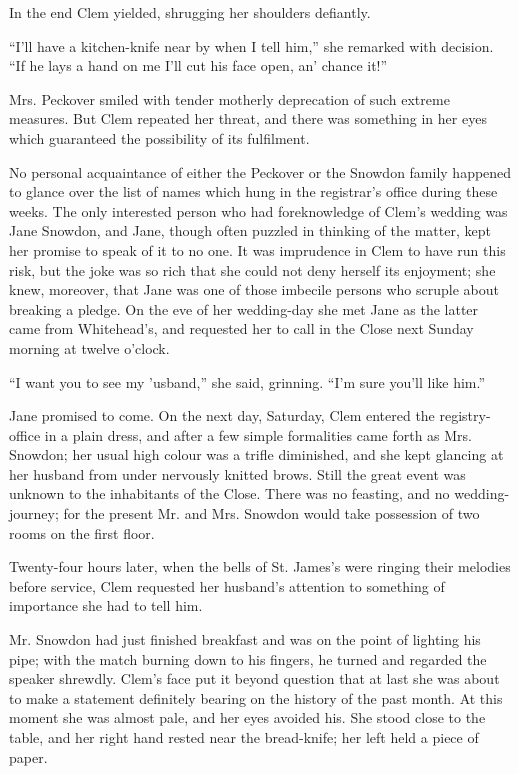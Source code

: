 In the end Clem yielded, shrugging her shoulders defiantly.

``I'll have a kitchen-knife near by when I tell him,'' she remarked with
decision. ``If he lays a hand on me I'll cut his face open, an' chance
it!''

Mrs. Peckover smiled with tender motherly deprecation of such extreme
measures. But Clem repeated her threat, and there was something in her
eyes which guaranteed the possibility of its fulfilment.

No personal acquaintance of either the {}Peckover or the Snowdon family
happened to glance over the list of names which hung in the registrar's
office during these weeks. The only interested person who had
foreknowledge of Clem's wedding was Jane Snowdon, and Jane, though often
puzzled in thinking of the matter, kept her promise to speak of it to no
one. It was imprudence in Clem to have run this risk, but the joke was
so rich that she could not deny herself its enjoyment; she knew,
moreover, that Jane was one of those imbecile persons who scruple about
breaking a pledge. On the eve of her wedding-day she met Jane as the
latter came from Whitehead's, and requested her to call in the Close
next Sunday morning at twelve o'clock.

``I want you to see my 'usband,'' she said, grinning. ``I'm sure you'll
like him.''

Jane promised to come. On the next day, Saturday, Clem entered the
registry-office in a plain dress, and after a few simple formalities
came forth as Mrs. Snowdon; her usual high colour was a trifle
diminished, and she {}kept glancing at her husband from under nervously
knitted brows. Still the great event was unknown to the inhabitants of
the Close. There was no feasting, and no wedding-journey; for the
present Mr. and Mrs. Snowdon would take possession of two rooms on the
first floor.

Twenty-four hours later, when the bells of St. James's were ringing
their melodies before service, Clem requested her husband's attention to
something of importance she had to tell him.

Mr. Snowdon had just finished breakfast and was on the point of lighting
his pipe; with the match burning down to his fingers, he turned and
regarded the speaker shrewdly. Clem's face put it beyond question that
at last she was about to make a statement definitely bearing on the
history of the past month. At this moment she was almost pale, and her
eyes avoided his. She stood close to the table, and her right hand
rested near the bread-knife; her left held a piece of paper.

